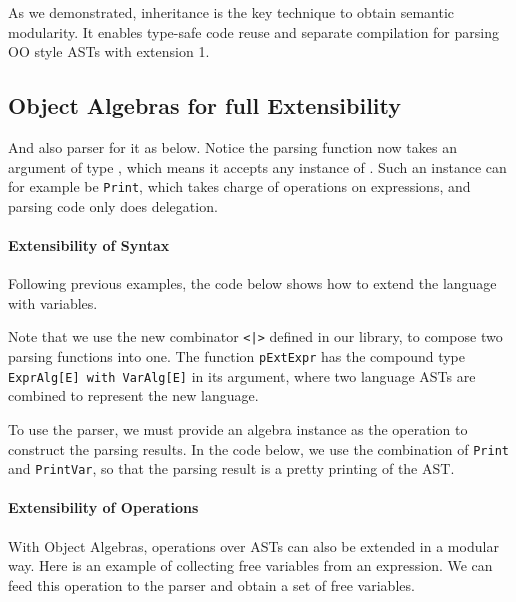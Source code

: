 As we demonstrated, inheritance is the key technique to obtain semantic modularity.
It enables type-safe code reuse and separate compilation for parsing OO style ASTs with extension 1.

\subsection{Object Algebras for full Extensibility}\label{subsec:overview-oa}

And also parser for it as below. Notice the parsing function  now takes an argument of type , which means it accepts any instance of . Such an instance can for example be \lstinline{Print}, which takes charge of operations on expressions, and parsing code only does delegation.



\paragraph{Extensibility of Syntax} Following previous examples, the code below shows how to extend the language with variables.

Note that we use the new combinator \lstinline{<|>} defined in our library, to compose two parsing functions into one. The function \lstinline{pExtExpr} has the compound type \lstinline{ExprAlg[E] with VarAlg[E]} in its argument, where two language ASTs are combined to represent the new language.

To use the parser, we must provide an algebra instance as the operation to construct the parsing results. In the code below, we use the combination of \lstinline{Print} and \lstinline{PrintVar}, so that the parsing result is a pretty printing of the AST.


\paragraph{Extensibility of Operations} With Object Algebras, operations over ASTs can also be extended in a modular way. Here is an example of collecting free variables from an expression. We can feed this operation to the parser and obtain a set of free variables.

